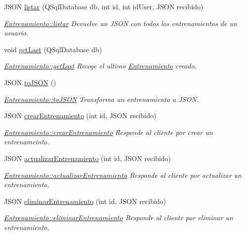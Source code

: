 \begin{DoxyCompactItemize}
J\+S\+ON \mbox{\hyperlink{classEntrenamiento_a83b01d0a9094c4e1161ede2d86f1b5af}{listar}} (Q\+Sql\+Database db, int id, int id\+User, J\+S\+ON recibido)
\begin{DoxyCompactList}\small\item\em \mbox{\hyperlink{classEntrenamiento_a83b01d0a9094c4e1161ede2d86f1b5af}{Entrenamiento\+::listar}} Devuelve un J\+S\+ON con todos los entrenamientos de un usuario. \end{DoxyCompactList}\item 
void \mbox{\hyperlink{classEntrenamiento_ac8f24acdf64f5b3887f6388fb82f0d4f}{get\+Last}} (Q\+Sql\+Database db)
\begin{DoxyCompactList}\small\item\em \mbox{\hyperlink{classEntrenamiento_ac8f24acdf64f5b3887f6388fb82f0d4f}{Entrenamiento\+::get\+Last}} Recoge el ultimo \mbox{\hyperlink{classEntrenamiento}{Entrenamiento}} creado. \end{DoxyCompactList}\item 
J\+S\+ON \mbox{\hyperlink{classEntrenamiento_a4a0e1dcb5ff226db68e8621a7102ee12}{to\+J\+S\+ON}} ()
\begin{DoxyCompactList}\small\item\em \mbox{\hyperlink{classEntrenamiento_a4a0e1dcb5ff226db68e8621a7102ee12}{Entrenamiento\+::to\+J\+S\+ON}} Transforma un entrenamiento a J\+S\+ON. \end{DoxyCompactList}\item 
J\+S\+ON \mbox{\hyperlink{classEntrenamiento_ae9d4c8c7082016c354e627456c8f067c}{crear\+Entrenamiento}} (int id, J\+S\+ON recibido)
\begin{DoxyCompactList}\small\item\em \mbox{\hyperlink{classEntrenamiento_ae9d4c8c7082016c354e627456c8f067c}{Entrenamiento\+::crear\+Entrenamiento}} Responde al cliente por crear un entrenameinto. \end{DoxyCompactList}\item 
J\+S\+ON \mbox{\hyperlink{classEntrenamiento_a230ba578e3ecb690f966eb695f58fda4}{actualizar\+Entrenamiento}} (int id, J\+S\+ON recibido)
\begin{DoxyCompactList}\small\item\em \mbox{\hyperlink{classEntrenamiento_a230ba578e3ecb690f966eb695f58fda4}{Entrenamiento\+::actualizar\+Entrenamiento}} Responde al cliente por actualizar un entrenamiento. \end{DoxyCompactList}\item 
J\+S\+ON \mbox{\hyperlink{classEntrenamiento_a78e00e1bdd4b78e879db628d6c8fcb78}{eliminar\+Entrenamiento}} (int id, J\+S\+ON recibido)
\begin{DoxyCompactList}\small\item\em \mbox{\hyperlink{classEntrenamiento_a78e00e1bdd4b78e879db628d6c8fcb78}{Entrenamiento\+::eliminar\+Entrenamiento}} Responde al cliente por eliminar un entrenamiento. \end{DoxyCompactList}\end{DoxyCompactItemize}


